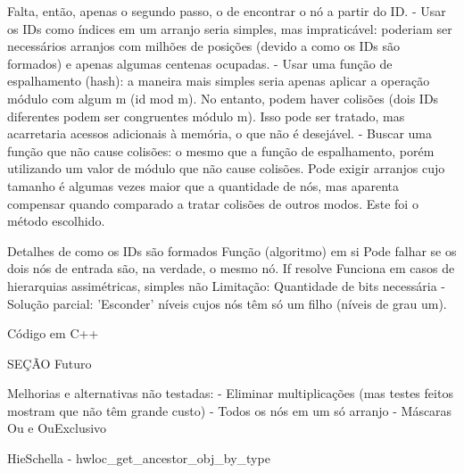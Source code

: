 

Falta, então, apenas o segundo passo, o de encontrar o nó a partir do ID.
- Usar os IDs como índices em um arranjo seria simples, mas impraticável:
poderiam ser necessários arranjos com milhões de posições (devido a como os IDs são formados) e apenas algumas centenas ocupadas.
- Usar uma função de espalhamento (hash): a maneira mais simples seria apenas aplicar a operação módulo com algum m (id mod m).
No entanto, podem haver colisões (dois IDs diferentes podem ser congruentes módulo m).
Isso pode ser tratado, mas acarretaria acessos adicionais à memória, o que não é desejável.
- Buscar uma função que não cause colisões: o mesmo que a função de espalhamento, porém utilizando um valor de módulo que não cause colisões.
Pode exigir arranjos cujo tamanho é algumas vezes maior que a quantidade de nós, mas aparenta compensar quando comparado a tratar colisões de outros modos.
Este foi o método escolhido.



Detalhes de como os IDs são formados
Função (algoritmo) em si
Pode falhar se os dois nós de entrada são, na verdade, o mesmo nó. If resolve
Funciona em casos de hierarquias assimétricas, simples não
Limitação: Quantidade de bits necessária - Solução parcial: 'Esconder' níveis cujos nós têm só um filho (níveis de grau um).


Código em C++


SEÇÃO Futuro

Melhorias e alternativas não testadas:
- Eliminar multiplicações (mas testes feitos mostram que não têm grande custo)
- Todos os nós em um só arranjo
- Máscaras Ou e OuExclusivo

HieSchella - hwloc\_get\_ancestor\_obj\_by\_type
